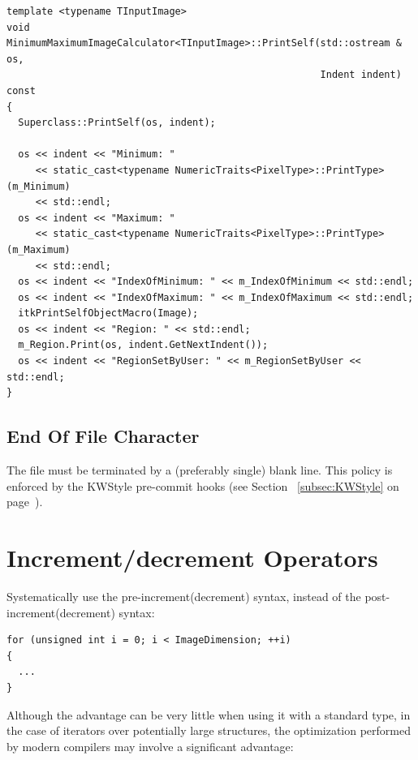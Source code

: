 \small
\begin{verbatim}
template <typename TInputImage>
void
MinimumMaximumImageCalculator<TInputImage>::PrintSelf(std::ostream & os,
                                                      Indent indent) const
{
  Superclass::PrintSelf(os, indent);

  os << indent << "Minimum: "
     << static_cast<typename NumericTraits<PixelType>::PrintType>(m_Minimum)
     << std::endl;
  os << indent << "Maximum: "
     << static_cast<typename NumericTraits<PixelType>::PrintType>(m_Maximum)
     << std::endl;
  os << indent << "IndexOfMinimum: " << m_IndexOfMinimum << std::endl;
  os << indent << "IndexOfMaximum: " << m_IndexOfMaximum << std::endl;
  itkPrintSelfObjectMacro(Image);
  os << indent << "Region: " << std::endl;
  m_Region.Print(os, indent.GetNextIndent());
  os << indent << "RegionSetByUser: " << m_RegionSetByUser << std::endl;
}
\end{verbatim}
\normalsize


\subsection{End Of File Character}%
\label{subsec:EndOfFileCharacter}

The file must be terminated by a (preferably single) blank line.
This policy is enforced by the KWStyle pre-commit hooks (see Section
~\ref{subsec:KWStyle} on page~\pageref{subsec:KWStyle}).


\section{Increment/decrement Operators}%
\label{sec:IncrementDecrementOperators}

Systematically use the pre-increment(decrement) syntax, instead of the
post-increment(decrement) syntax:

\small
\begin{verbatim}
for (unsigned int i = 0; i < ImageDimension; ++i)
{
  ...
}
\end{verbatim}
\normalsize

Although the advantage can be very little when using it with a standard type,
in the case of iterators over potentially large structures, the optimization
performed by modern compilers may involve a significant advantage:

